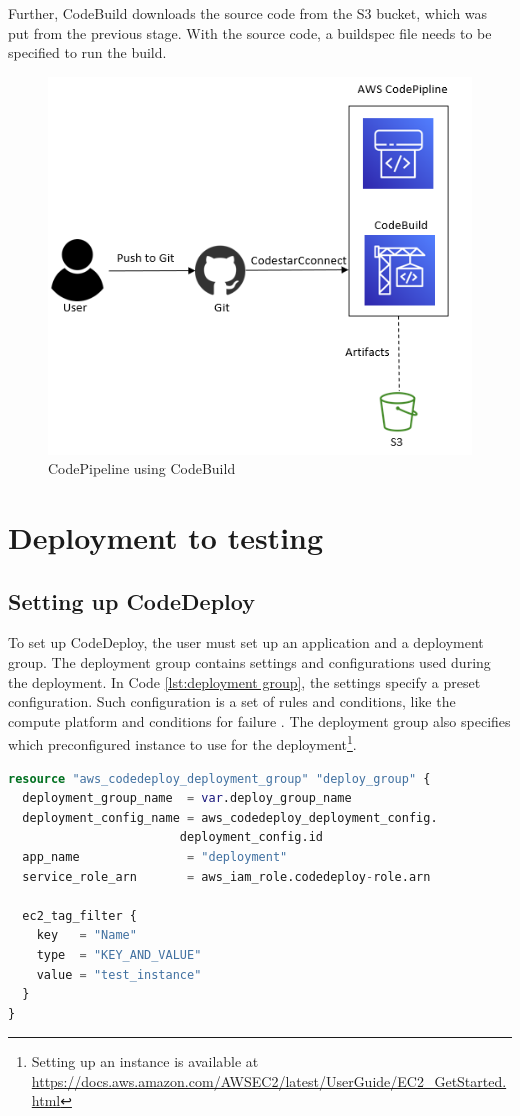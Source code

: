 Further, CodeBuild downloads the source code from the S3 bucket, which was put from the previous stage. With the source code, a \gls{buildspec} file needs to be specified to run the build.

\vspace{2mm}
\begin{figure}[H]
    \centering
    \includegraphics[width=0.6\columnwidth]{Images/aws-piplin-3.png}
    \caption{CodePipeline using CodeBuild}
    \label{fig: CodePipeline using CodeBuild}
\end{figure}

\section{Deployment to testing}
\label{Deployment to testing}
\subsection{Setting up CodeDeploy}
To set up CodeDeploy, the user must set up an application and a deployment group. The deployment group contains settings and configurations used during the deployment. In Code \ref{lst:deployment group}, the settings specify a preset configuration. Such configuration is a set of rules and conditions, like the compute platform and conditions for failure \cite{CodeDeployConfig}. The deployment group also specifies which preconfigured instance to use for the deployment\footnote{Setting up an instance is available at \url{https://docs.aws.amazon.com/AWSEC2/latest/UserGuide/EC2_GetStarted.html}}. 

\vspace{2mm}
\begin{lstlisting}[language=terraform, caption=Create the deployment group, captionpos=b, frame=single, label= {lst:deployment group}]
resource "aws_codedeploy_deployment_group" "deploy_group" {
  deployment_group_name  = var.deploy_group_name
  deployment_config_name = aws_codedeploy_deployment_config.
                        deployment_config.id
  app_name               = "deployment"
  service_role_arn       = aws_iam_role.codedeploy-role.arn

  ec2_tag_filter {
    key   = "Name"
    type  = "KEY_AND_VALUE"
    value = "test_instance"
  }
}
\end{lstlisting}

